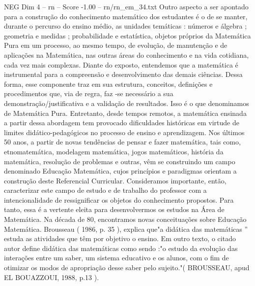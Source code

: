 \begin{textsample}{NEG Dim 4 – rn – Score -1.00 – rn/rn\_em\_34.txt}
Outro aspecto a ser apontado para a construção do conhecimento matemático dos estudantes é o de se manter, durante o percurso do ensino médio, as unidades temáticas : números e álgebra ; geometria e medidas ; probabilidade e estatística, objetos próprios da Matemática Pura em um processo, ao mesmo tempo, de evolução, de manutenção e de aplicações na Matemática, nas outras áreas do conhecimento e na vida cotidiana, cada vez mais complexas.
Diante do exposto, entendemos que a matemática é instrumental para a compreensão e desenvolvimento das demais ciências.
Dessa forma, esse componente traz em sua estrutura, conceitos, definições e procedimentos que, via de regra, faz -se necessário a sua demonstração/justificativa e a validação de resultados.
Isso é o que denominamos de Matemática Pura.
Entretanto, desde tempos remotos, a matemática ensinada a partir dessa abordagem tem provocado dificuldades históricas em virtude de limites didático-pedagógicos no processo de ensino e aprendizagem.
Nos últimos 50 anos, a partir de novas tendências de pensar e fazer matemática, tais como, etnomatemática, modelagem matemática, jogos matemáticos, história da matemática, resolução de problemas e outras, vêm se construindo um campo denominado Educação Matemática, cujos princípios e paradigmas orientam a construção deste Referencial Curricular.
Consideramos importante, então, caracterizar este campo de estudo e de trabalho do professor com a intencionalidade de ressignificar os objetos do conhecimento propostos.
Para tanto, essa é a vertente eleita para desenvolvermos os estudos na Área de Matemática.
Na década de 80, encontramos novas conceituações sobre Educação Matemática.
Brousseau ( 1986, p. 35 ), explica que"a didática das matemáticas ” estuda as atividades que têm por objetivo o ensino.
Em outro texto, o citado autor define didática das matemáticas como sendo :"o estudo da evolução das interações entre um saber, um sistema educativo e os alunos, com o fim de otimizar os modos de apropriação desse saber pelo sujeito."( BROUSSEAU, apud EL BOUAZZOUI, 1988, p.13 ).

\end{textsample}
